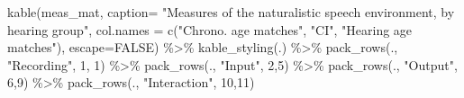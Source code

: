 \documentclass[
]{article}
\newenvironment{Shaded}{\begin{snugshade}}{\end{snugshade}}
\newcommand{\AttributeTok}[1]{\textcolor[rgb]{0.77,0.63,0.00}{#1}}
\newcommand{\ConstantTok}[1]{\textcolor[rgb]{0.00,0.00,0.00}{#1}}
\newcommand{\DecValTok}[1]{\textcolor[rgb]{0.00,0.00,0.81}{#1}}
\newcommand{\FunctionTok}[1]{\textcolor[rgb]{0.00,0.00,0.00}{#1}}
\newcommand{\NormalTok}[1]{#1}
\newcommand{\SpecialCharTok}[1]{\textcolor[rgb]{0.00,0.00,0.00}{#1}}
\newcommand{\StringTok}[1]{\textcolor[rgb]{0.31,0.60,0.02}{#1}}
\begin{document}
\begin{Shaded}
\begin{Highlighting}[]
\FunctionTok{kable}\NormalTok{(meas\_mat,}
             \AttributeTok{caption=} \StringTok{"Measures of the naturalistic speech environment, by hearing group"}\NormalTok{,}
             \AttributeTok{col.names =} \FunctionTok{c}\NormalTok{(}\StringTok{"Chrono. age matches"}\NormalTok{, }
                           \StringTok{"CI"}\NormalTok{, }
                           \StringTok{"Hearing age matches"}\NormalTok{),}
      \AttributeTok{escape=}\ConstantTok{FALSE}\NormalTok{) }\SpecialCharTok{\%\textgreater{}\%} 
  \FunctionTok{kable\_styling}\NormalTok{(.) }\SpecialCharTok{\%\textgreater{}\%}
  \FunctionTok{pack\_rows}\NormalTok{(., }\StringTok{"Recording"}\NormalTok{, }\DecValTok{1}\NormalTok{, }\DecValTok{1}\NormalTok{) }\SpecialCharTok{\%\textgreater{}\%}
  \FunctionTok{pack\_rows}\NormalTok{(., }\StringTok{"Input"}\NormalTok{, }\DecValTok{2}\NormalTok{,}\DecValTok{5}\NormalTok{) }\SpecialCharTok{\%\textgreater{}\%}
  \FunctionTok{pack\_rows}\NormalTok{(., }\StringTok{"Output"}\NormalTok{, }\DecValTok{6}\NormalTok{,}\DecValTok{9}\NormalTok{) }\SpecialCharTok{\%\textgreater{}\%}
  \FunctionTok{pack\_rows}\NormalTok{(., }\StringTok{"Interaction"}\NormalTok{, }\DecValTok{10}\NormalTok{,}\DecValTok{11}\NormalTok{)}
\end{Highlighting}
\end{Shaded}
\end{document}
